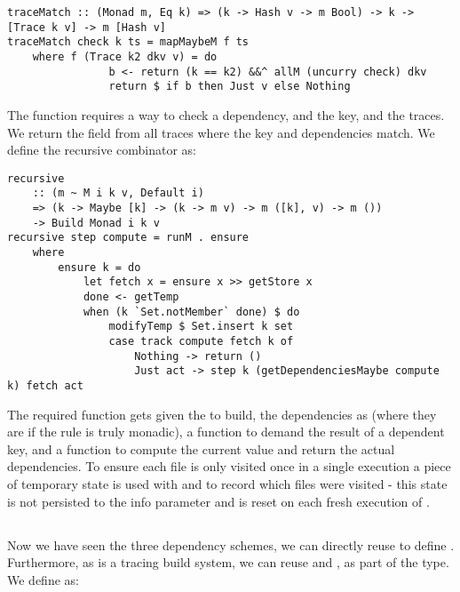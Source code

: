 \begin{verbatim}
traceMatch :: (Monad m, Eq k) => (k -> Hash v -> m Bool) -> k -> [Trace k v] -> m [Hash v]
traceMatch check k ts = mapMaybeM f ts
    where f (Trace k2 dkv v) = do
                b <- return (k == k2) &&^ allM (uncurry check) dkv
                return $ if b then Just v else Nothing
\end{verbatim}

The function  requires a way to check a dependency, and the key, and the traces. We return the  field from all traces where the key and dependencies match. We define the recursive combinator as:

\begin{verbatim}
recursive
    :: (m ~ M i k v, Default i)
    => (k -> Maybe [k] -> (k -> m v) -> m ([k], v) -> m ())
    -> Build Monad i k v
recursive step compute = runM . ensure
    where
        ensure k = do
            let fetch x = ensure x >> getStore x
            done <- getTemp
            when (k `Set.notMember` done) $ do
                modifyTemp $ Set.insert k set
                case track compute fetch k of
                    Nothing -> return ()
                    Just act -> step k (getDependenciesMaybe compute k) fetch act
\end{verbatim}

The required  function gets given the  to build, the dependencies as  (where they are  if the rule is truly monadic), a function to demand the result of a dependent key, and a function to compute the current value and return the actual dependencies. To ensure each file is only visited once in a single execution a piece of temporary state is used with  and  to record which files were visited - this state is not persisted to the  info parameter and is reset on each fresh execution of .

\subsection{\Bazel}\label{sec-implementation-bazel}


Now we have seen the three dependency schemes, we can directly reuse  to define \Bazel. Furthermore, as \Bazel is a tracing build system, we can reuse  and , as part of the  type. We define \Bazel as:

